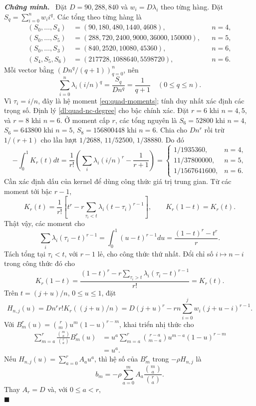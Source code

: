 \documentclass[12pt,a4paper,oneside]{book}
\numberwithin{algorithm}{chapter}
\theoremstyle{definition}
\newenvironment{chungminh}{\par\medskip\noindent\textbf{\textit{\color{mainblue}Chứng minh.}}\ }{\hfill$\blacksquare$\par\medskip}
\begin{document}
\begin{chungminh}
Đặt $D=90,288,840$ và $w_i=D\lambda_i$ theo từng hàng. 
Đặt $S_q=\sum_{i=0}^nw_i i^q$. Các tổng theo từng hàng là
\begin{align*}
 (S_0,\ldots,S_4)&=(90,180,480,1440,4608),&&n=4,\\
 (S_0,\ldots,S_5)&=(288,720,2400,9000,36000,150000),&&n=5,\\
 (S_0,\ldots,S_3)&=(840,2520,10080,45360),&&n=6,\\
 (S_4,S_5,S_6)&=(217728,1088640,5598720),&&n=6.
\end{align*}
Mỗi vector bằng $(Dn^q/(q+1))_{q=0}^n$, nên
\[
 \sum_{i=0}^n\lambda_i(i/n)^q=\frac{S_q}{Dn^q}=\frac1{q+1}\quad(0\leq q\leq n).
\]
Vì $\tau_i=i/n$, đây là hệ moment \eqref{eq:quad-moments}; tính duy nhất xác định các trọng số. Định lý \ref{dl:quad-nc-degree} cho bậc chính xác. Đặt $r=6$ khi $n=4,5$, và $r=8$ khi $n=6$. 
Ở moment cấp $r$, các tổng nguyên là $S_6=52800$ khi $n=4$, $S_6=643800$ khi $n=5$, $S_8=156800448$ khi $n=6$. Chia cho $Dn^r$ rồi trừ $1/(r+1)$ cho lần lượt $1/2688$, $11/52500$, $1/38880$. Do đó
\[
 -\int_0^1K_r(t)dt=\frac1{r!}\left(\sum_i\lambda_i(i/n)^r-\frac1{r+1}\right)
 =\begin{cases}
 1/1935360,&n=4,\\
 11/37800000,&n=5,\\
 1/1567641600,&n=6.
 \end{cases}
\]
Cần xác định dấu của kernel để dùng công thức giá trị trung gian. Từ các moment tới bậc $r-1$,
\[
 K_r(t)=\frac1{r!}\left[t^r-r\sum_{\tau_i<t}\lambda_i(t-\tau_i)^{r-1}\right],
 \qquad K_r(1-t)=K_r(t).
\]
Thật vậy, các moment cho
\[
 \sum_i\lambda_i(\tau_i-t)^{r-1}=\int_0^1(u-t)^{r-1}du
 =\frac{(1-t)^r-t^r}{r}.
\]
Tách tổng tại $\tau_i<t$, với $r-1$ lẻ, cho công thức thứ nhất. Đổi chỉ số $i\mapsto n-i$ trong công thức đó cho
\[
 K_r(1-t)=\frac{(1-t)^r-r\sum_{\tau_i>t}\lambda_i(\tau_i-t)^{r-1}}{r!}=K_r(t).
\] Trên $t=(j+u)/n$, $0\leq u\leq1$, đặt
\[
 H_{n,j}(u)=Dn^rr!K_r((j+u)/n)
 =D(j+u)^r-rn\sum_{i=0}^jw_i(j+u-i)^{r-1}.
\]
Với $B_m^r(u)=\binom rm u^m(1-u)^{r-m}$, khai triển nhị thức cho
\begin{align*}
 \sum_{m=a}^r\frac{\binom ma}{\binom ra}B_m^r(u)
 &=u^a\sum_{m=a}^r\binom{r-a}{m-a}u^{m-a}(1-u)^{r-m}\\
 &=u^a.
\end{align*}
Nếu $H_{n,j}(u)=\sum_{a=0}^r A_a u^a$, thì hệ số của $B_m^r$ trong $-\rho H_{n,j}$ là
\[
 b_m=-\rho\sum_{a=0}^m A_a\frac{\binom ma}{\binom ra}.
\]
Thay $A_r=D$ và, với $0\leq a<r$,
\[
\]
\end{chungminh}
\end{document}
